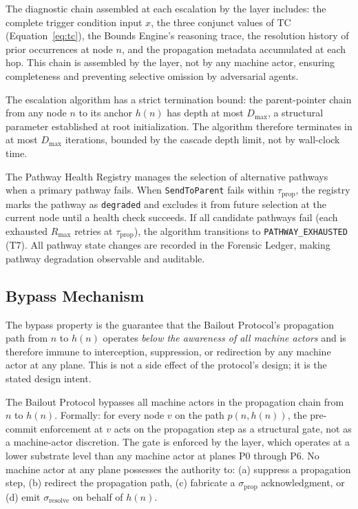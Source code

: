 The diagnostic chain assembled at each escalation by the \fact{} layer includes: the complete trigger condition input $x$, the three conjunct values of TC (Equation~\ref{eq:tc}), the Bounds Engine's reasoning trace, the resolution history of prior occurrences at node $n$, and the propagation metadata accumulated at each hop. This chain is assembled by the \fact{} layer, not by any machine actor, ensuring completeness and preventing selective omission by adversarial agents.

The escalation algorithm has a strict termination bound: the parent-pointer chain from any node $n$ to its anchor $h(n)$ has depth at most $D_{\max}$, a structural parameter established at root initialization. The algorithm therefore terminates in at most $D_{\max}$ iterations, bounded by the cascade depth limit, not by wall-clock time.

The Pathway Health Registry manages the selection of alternative pathways when a primary pathway fails. When \texttt{SendToParent} fails within $\tau_{\text{prop}}$, the registry marks the pathway as \texttt{degraded} and excludes it from future selection at the current node until a health check succeeds. If all candidate pathways fail (each exhausted $R_{\max}$ retries at $\tau_{\text{prop}}$), the algorithm transitions to \texttt{PATHWAY\_EXHAUSTED} (T7). All pathway state changes are recorded in the Forensic Ledger, making pathway degradation observable and auditable.

\subsection{Bypass Mechanism}
\label{sec:bp-bypass}

The bypass property is the guarantee that the Bailout Protocol's propagation path from $n$ to $h(n)$ operates \textit{below the awareness of all machine actors} and is therefore immune to interception, suppression, or redirection by any machine actor at any plane. This is not a side effect of the protocol's design; it is the stated design intent.

\begin{definition}
\label{def:bypass}
The Bailout Protocol bypasses all machine actors in the propagation chain from $n$ to $h(n)$. Formally: for every node $v$ on the path $p(n, h(n))$, the pre-commit enforcement at $v$ acts on the propagation step as a structural gate, not as a machine-actor discretion. The gate is enforced by the \fact{} layer, which operates at a lower substrate level than any machine actor at planes P0 through P6. No machine actor at any plane possesses the authority to: (a) suppress a propagation step, (b) redirect the propagation path, (c) fabricate a $\sigma_{\text{prop}}$ acknowledgment, or (d) emit $\sigma_{\text{resolve}}$ on behalf of $h(n)$.
\end{definition}

